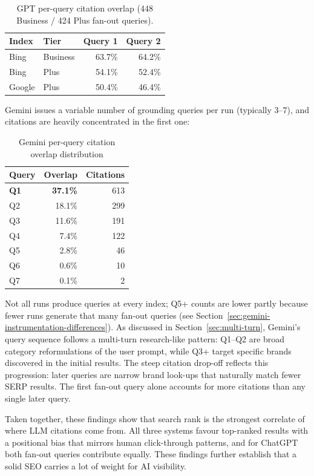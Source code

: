 \begin{table}[H]
\centering
\caption{GPT per-query citation overlap (448 Business / 424 Plus fan-out queries).}
\label{tab:gpt-per-query}
\begin{tabular}{llrr}
\toprule
Index & Tier & Query 1 & Query 2 \\
\midrule
Bing & Business & 63.7\% & 64.2\% \\
Bing & Plus & 54.1\% & 52.4\% \\
Google & Plus & 50.4\% & 46.4\% \\
\bottomrule
\end{tabular}
\end{table}

Gemini issues a variable number of grounding queries per run (typically 3--7), and citations are heavily concentrated in the first one:

\begin{table}[H]
\centering
\caption{Gemini per-query citation overlap distribution}
\label{tab:gemini-per-query}
\begin{tabular}{lrr}
\toprule
Query & Overlap & Citations \\
\midrule
\textbf{Q1} & \textbf{37.1\%} & 613 \\
Q2 & 18.1\% & 299 \\
Q3 & 11.6\% & 191 \\
Q4 & 7.4\% & 122 \\
Q5 & 2.8\% & 46 \\
Q6 & 0.6\% & 10 \\
Q7 & 0.1\% & 2 \\
\bottomrule
\end{tabular}
\end{table}

Not all runs produce queries at every index; Q5+ counts are lower
partly because fewer runs generate that many fan-out queries
(see Section~\ref{sec:gemini-instrumentation-differences}). As discussed in
Section~\ref{sec:multi-turn}, Gemini's query sequence follows a
multi-turn research-like pattern: Q1--Q2 are broad category
reformulations of the user prompt, while Q3+ target specific
brands discovered in the initial results. The steep citation
drop-off reflects this progression: later queries are narrow
brand look-ups that naturally match fewer SERP results. The first fan-out query alone accounts for more citations than any single later query.

Taken together, these findings show that search rank is the strongest correlate of where LLM citations come from. All three systems favour top-ranked 
results with a positional bias that mirrors human click-through patterns, 
and for ChatGPT both fan-out queries contribute equally. These findings 
further establish that a solid SEO carries a lot of weight for AI visibility.

